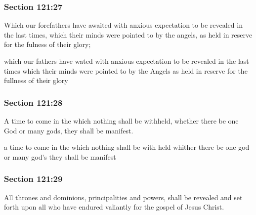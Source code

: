 	\subsubsection{Section 121:27} %
		\label{DC121-27}

		Which our forefathers have awaited with anxious expectation to be revealed in the last times, which their minds were pointed to by the angels, as held in reserve for the fulness of their glory;

		\begin{framed}
		\scriptsize
			\begin{compactdesc}
				\item[JSP] which our fathers have wated with anxious expectation to be revealed in the last times which their minds were pointed to by the Angels as held in reserve for the fullness of their glory
			\end{compactdesc}
		\end{framed}

	\subsubsection{Section 121:28} %
		\label{DC121-28}

		A time to come in the which nothing shall be withheld, whether there be one God or many gods, they shall be manifest.

		\begin{framed}
		\scriptsize
			\begin{compactdesc}
				\item[JSP] a time to come in the which nothing shall be with held whither there be one god or many god's they shall be manifest
			\end{compactdesc}
		\end{framed}

	\subsubsection{Section 121:29} %
		\label{DC121-29}

		All thrones and dominions, principalities and powers, shall be revealed and set forth upon all who have endured valiantly for the gospel of Jesus Christ.

